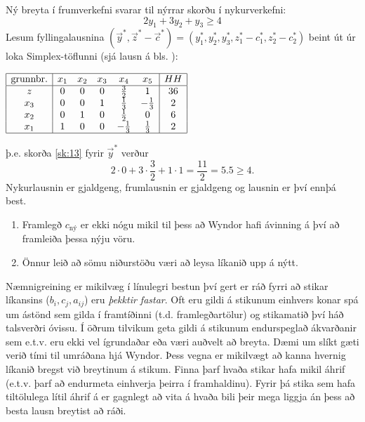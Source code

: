 \begin{lausn}Ný breyta í frumverkefni svarar til nýrrar skorðu í nykurverkefni:
\begin{equation}\label{sk:13}
 2y_1+3y_2+y_3\geq4 
\end{equation}
Lesum fyllingalausnina $(\vec{y}^*,\vec{z}^*-\vec{c}^*)=(y_1^*,y_2^*,y_3^*,z_1^*-c_1^*,z_2^*-c_2^*)$ beint út úr loka Simplex-töflunni (sjá lausn á bls. \pageref{wyndor:simplex}):
\begin{center}
{\renewcommand{\arraystretch}{1.5} \renewcommand{\tabcolsep}{0.2cm}
{\scriptsize
$\begin{array}{|c|ccccc|c|} \hline 
\textrm{grunnbr.} &  x_1 &  x_2 &   x_3 &  x_4 &  x_5 &  HH  \\ \hline 
z   &0 & 0 & 0 & \frac{3}{2} & 1 &  36 \\
x_3& 0 & 0 & 1 & \frac{1}{3} & -\frac{1}{3} & 2 \\
x_2& 0 & 1 & 0 & \frac{1}{2} & 0 & 6  \\
x_1& 1 & 0 & 0 &-\frac{1}{3} & \frac{1}{3} & 2  \\ \hline 
\end{array}$
}}\end{center}
þ.e. skorða \eqref{sk:13} fyrir $\vec{y}^*$ verður
$$2\cdot 0+3\cdot \frac{3}{2}+1\cdot1=\frac{11}{2} =5.5\geq 4.$$
Nykurlausnin er gjaldgeng, frumlausnin er gjaldgeng og lausnin er því ennþá best.
\begin{samepage}
\begin{aths}\hspace{.1cm}
  \begin{enumerate}[label=(\roman{*})]
  \item Framlegð $c_{\textrm{ný}}$ er ekki nógu mikil til þess að Wyndor hafi ávinning á því að framleiða þessa nýju vöru.
  \item Önnur leið að sömu niðurstöðu væri að leysa líkanið upp á nýtt.
  \end{enumerate}
\end{aths}\end{samepage}
\end{lausn}

Næmnigreining er mikilvæg í línulegri bestun því gert er ráð fyrri að stikar líkansins ($b_i,c_j,a_{ij}$) eru \emph{þekktir fastar}. Oft eru gildi á stikunum  einhvers konar spá um ástönd sem gilda í framtíðinni (t.d. framlegðartölur) og stikamatið því háð talsverðri óvissu. Í öðrum tilvikum geta gildi á stikunum endurspeglað ákvarðanir sem e.t.v. eru ekki vel ígrundaðar eða væri auðvelt að breyta. Dæmi um slíkt gæti verið tími til umráðana hjá Wyndor.
Þess vegna er mikilvægt að kanna hvernig líkanið bregst við breytinum á stikum. Finna þarf hvaða stikar hafa mikil áhrif (e.t.v. þarf að endurmeta einhverja þeirra í framhaldinu). Fyrir þá stika sem hafa tiltölulega lítil áhrif á er gagnlegt að vita á hvaða bili þeir mega liggja án þess að besta lausn breytist að ráði. 

